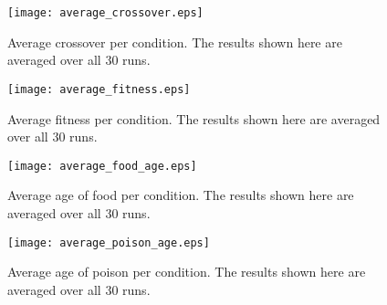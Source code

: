 \begin{figure}[H]
\centering
\texttt{[image: average\_crossover.eps]}
\caption{Average crossover per condition. The results shown here are averaged over all $30$ runs.}
\label{fig:avgcross}
\end{figure}

\begin{figure}[H]
\centering
\texttt{[image: average\_fitness.eps]}
\caption{Average fitness per condition. The results shown here are averaged over all $30$ runs.}
\label{fig:avgfit}
\end{figure}

\begin{figure}[H]
\centering
\texttt{[image: average\_food\_age.eps]}
\caption{Average age of food per condition. The results shown here are averaged over all $30$ runs.}
\label{fig:avgfood}
\end{figure}

\begin{figure}[H]
\centering
\texttt{[image: average\_poison\_age.eps]}
\caption{Average age of poison per condition. The results shown here are averaged over all $30$ runs.}
\label{fig:avgpois}
\end{figure}
